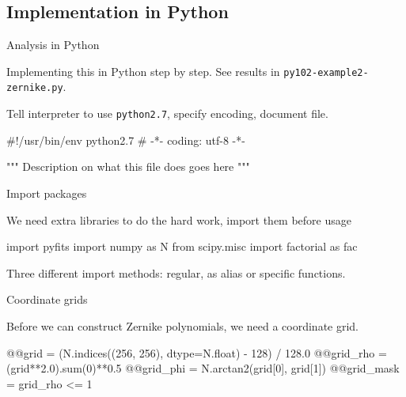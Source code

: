 \documentclass[xetex,10pt]{beamer}
\def\spacer{\vspace*{1em}}
\begin{document}
\subsection{Implementation in Python}

\begin{frame}[fragile]{Analysis in Python}

Implementing this in Python step by step. See results in \texttt{py102-example2-zernike.py}.

\pause
\spacer

Tell interpreter to use \verb!python2.7!, specify encoding, document file.
\begin{pythonln}[firstnumber=1]
#!/usr/bin/env python2.7
# -*- coding: utf-8 -*-

"""
Description on what this file does goes here
"""
\end{pythonln}
\end{frame}

\begin{frame}[fragile]{Import packages}

We need extra libraries to do the hard work, import them before usage

\spacer

\begin{pythonln}[firstnumber=21]
import pyfits
import numpy as N
from scipy.misc import factorial as fac
\end{pythonln}
\spacer

Three different import methods: regular, as alias or specific functions.
\end{frame}

\begin{frame}[fragile]{Coordinate grids}

Before we can construct Zernike polynomials, we need a coordinate grid.

\spacer
\begin{pythonln}[firstnumber=87]
@@grid = (N.indices((256, 256), dtype=N.float) - 128) / 128.0
@@grid_rho = (grid**2.0).sum(0)**0.5
@@grid_phi = N.arctan2(grid[0], grid[1])
@@grid_mask = grid_rho <= 1
\end{pythonln}
\end{frame}
\end{document}
